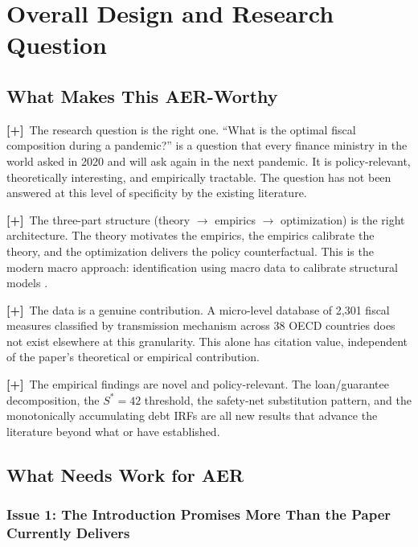 \documentclass[12pt, a4paper]{article}
\newcommand{\strength}[1]{\textcolor{strength}{\textbf{[+]}~#1}}
\begin{document}
\section{Overall Design and Research Question}

\subsection{What Makes This AER-Worthy}

\strength{The research question is the right one.} ``What is the optimal fiscal composition during a pandemic?'' is a question that every finance ministry in the world asked in 2020 and will ask again in the next pandemic. It is policy-relevant, theoretically interesting, and empirically tractable. The question has not been answered at this level of specificity by the existing literature.

\strength{The three-part structure (theory $\to$ empirics $\to$ optimization) is the right architecture.} The theory motivates the empirics, the empirics calibrate the theory, and the optimization delivers the policy counterfactual. This is the modern macro approach: identification using macro data to calibrate structural models \citep{nakamura2018}.

\strength{The data is a genuine contribution.} A micro-level database of 2,301 fiscal measures classified by transmission mechanism across 38 OECD countries does not exist elsewhere at this granularity. This alone has citation value, independent of the paper's theoretical or empirical contribution.

\strength{The empirical findings are novel and policy-relevant.} The loan/guarantee decomposition, the $S^* = 42$ threshold, the safety-net substitution pattern, and the monotonically accumulating debt IRFs are all new results that advance the literature beyond what \citet{deb2021} or \citet{chetty2020} have established.


\subsection{What Needs Work for AER}

\subsubsection*{Issue 1: The Introduction Promises More Than the Paper Currently Delivers}
\end{document}
